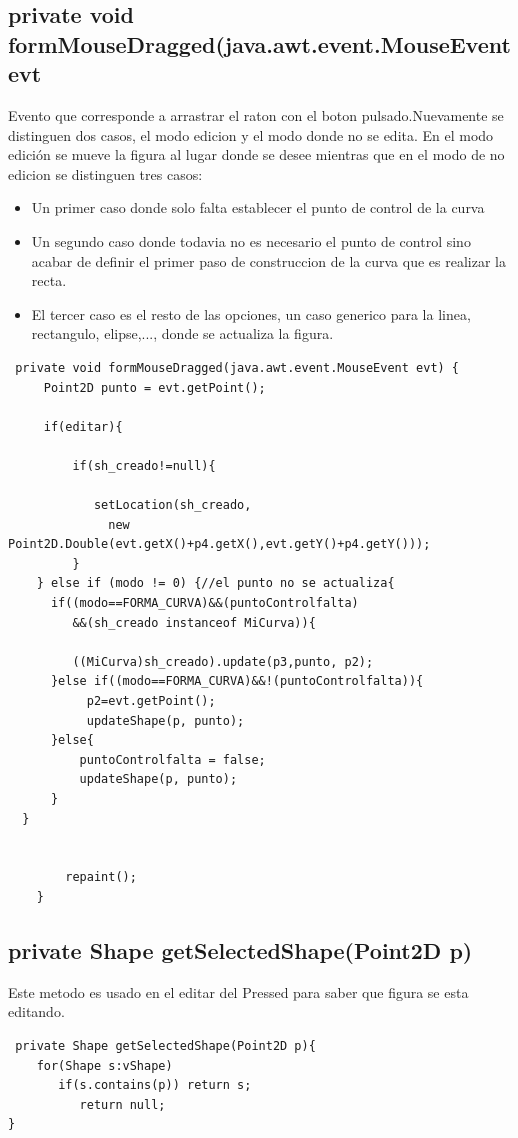 \subsection*{private void formMouseDragged(java.awt.event.MouseEvent evt}
Evento que corresponde a arrastrar el raton con el boton pulsado.Nuevamente se distinguen dos casos, el modo edicion y el modo donde no se edita.
En el modo edición se mueve la figura al lugar donde se desee mientras que en el modo de no edicion se distinguen tres casos:
\begin{itemize}
\item Un primer caso donde solo falta establecer el punto de control de la curva
\item Un segundo caso donde todavia no es necesario el punto de control sino acabar de definir el primer paso de construccion de la curva que es realizar la recta.
\item El tercer caso es el resto de las opciones, un caso generico para la linea, rectangulo, elipse,..., donde se actualiza la figura.
\end{itemize}
\begin{lstlisting}
 private void formMouseDragged(java.awt.event.MouseEvent evt) {                                  
     Point2D punto = evt.getPoint();
            
     if(editar){
                       
         if(sh_creado!=null){
                      
            setLocation(sh_creado,
              new Point2D.Double(evt.getX()+p4.getX(),evt.getY()+p4.getY())); 
         }
    } else if (modo != 0) {//el punto no se actualiza{
      if((modo==FORMA_CURVA)&&(puntoControlfalta)
         &&(sh_creado instanceof MiCurva)){
                       
         ((MiCurva)sh_creado).update(p3,punto, p2);
      }else if((modo==FORMA_CURVA)&&!(puntoControlfalta)){
           p2=evt.getPoint();
           updateShape(p, punto);
      }else{
          puntoControlfalta = false;
          updateShape(p, punto);
      }
  }
    
             
        repaint();
    }     
\end{lstlisting}

\subsection*{private Shape getSelectedShape(Point2D p)}
Este metodo es usado en el editar del Pressed para saber que figura se esta editando.
\begin{lstlisting}
 private Shape getSelectedShape(Point2D p){
    for(Shape s:vShape)
       if(s.contains(p)) return s;
          return null;
}
\end{lstlisting}

